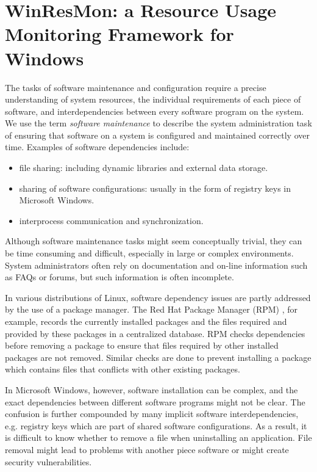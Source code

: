 \section{WinResMon: a Resource Usage Monitoring Framework for Windows}


The tasks of software maintenance and configuration require a precise
understanding of system resources, the individual requirements of each piece
of software, and interdependencies between every software program on the
system.  We use the term {\em software maintenance} to describe the system
administration task of ensuring that software on a system is configured and
maintained correctly over time.  Examples of software dependencies include:

\begin{itemize}
\item file sharing: including dynamic libraries and external data storage.
\item sharing of software configurations: usually in the form of registry keys
in Microsoft Windows.
\item interprocess communication and synchronization.
\end{itemize}

Although software maintenance tasks might seem conceptually trivial, they can
be time consuming and difficult, especially in large or complex environments.
System administrators often rely on documentation and on-line information such
as FAQs or forums, but such information is often incomplete.

In various distributions of Linux, software dependency issues are partly
addressed by the use of a package manager.  The Red Hat Package Manager (RPM)
\cite{ewing1996rpm}, for example, records the currently installed packages and the
files required and provided by these packages in a centralized database.  RPM
checks dependencies before removing a package to ensure that files required by
other installed packages are not removed.  Similar checks are done to prevent
installing a package which contains files that conflicts with other existing
packages.

In Microsoft Windows, however, software installation can be complex, and the
exact dependencies between different software programs might not be clear.
The confusion is further compounded by many implicit software
interdependencies, e.g. registry keys which are part of shared software
configurations.  As a result, it is difficult to know whether to remove a file
when uninstalling an application.  File removal might lead to problems with
another piece software or might create security vulnerabilities.  

